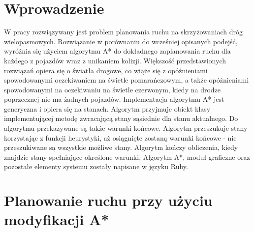  \label{chap:thesis}


\section{Wprowadzenie}

W pracy rozwiązywany jest problem planowania ruchu na skrzyżowaniach dróg wielopasmowych. Rozwiązanie w porównaniu do wcześniej opisanych podejść, wyróżnia się użyciem algorytmu A* do dokładnego zaplanowania ruchu dla każdego z pojazdów wraz z unikaniem kolizji. Większość przedstawionych rozwiązań opiera się o światła drogowe, co wiąże się z opóźnieniami spowodowanymi oczekiwaniem na świetle pomarańczowym, a także opóźnieniami spowodowanymi na oczekiwaniu na świetle czerwonym, kiedy na drodze poprzecznej nie ma żadnych pojazdów. Implementacja algorytmu A* jest generyczna i opiera się na stanach. Algorytm przyjmuje obiekt klasy implementującej metodę zwracającą stany sąsiednie dla stanu aktualnego. Do algorytmu przekazywane są także warunki końcowe. Algorytm przeszukuje stany korzystając z funkcji heurystyki, aż osiągnięte zostaną warunki końcowe - nie przeszukiwane są wszystkie możliwe stany. Algorytm kończy obliczenia, kiedy znajdzie stany spełniające określone warunki. Algorytm A*, moduł graficzne oraz pozostałe elementy systemu zostały napisane w języku Ruby.

\section{Planowanie ruchu przy użyciu modyfikacji A*}

